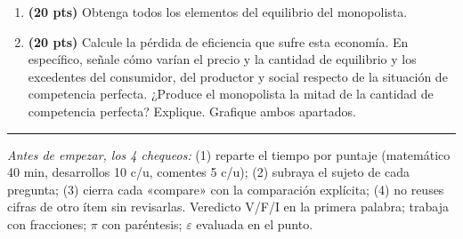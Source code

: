 \documentclass[11pt]{article}
\begin{document}
\begin{enumerate}[label=\alph*), leftmargin=*, itemsep=8pt]
\item \textbf{(20 pts)} Obtenga todos los elementos del equilibrio del monopolista.

\item \textbf{(20 pts)} Calcule la pérdida de eficiencia que sufre esta economía. En específico, señale cómo varían el precio y la cantidad de equilibrio y los excedentes del consumidor, del productor y social respecto de la situación de competencia perfecta. ¿Produce el monopolista la mitad de la cantidad de competencia perfecta? Explique. Grafique ambos apartados.
\end{enumerate}

\medskip
\hrule
\smallskip
{\small\textit{Antes de empezar, los 4 chequeos:} (1) reparte el tiempo por puntaje (matemático 40 min, desarrollos 10 c/u, comentes 5 c/u); (2) subraya el sujeto de cada pregunta; (3) cierra cada «compare» con la comparación explícita; (4) no reuses cifras de otro ítem sin revisarlas. Veredicto V/F/I en la primera palabra; trabaja con fracciones; $\pi$ con paréntesis; $\varepsilon$ evaluada en el punto.}
\end{document}
